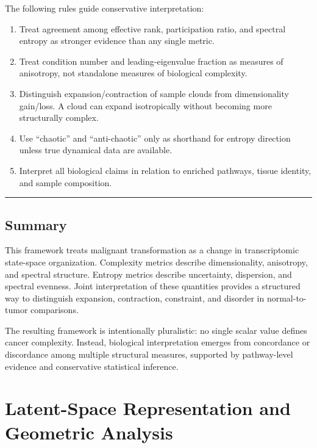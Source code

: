 \documentclass[
  letterpaper,
  DIV=11,
  numbers=noendperiod,
  openany,
  oneside]{scrreprt}
\providecommand{\tightlist}{%
  \setlength{\itemsep}{0pt}\setlength{\parskip}{0pt}}
\begin{document}
The following rules guide conservative interpretation:

\begin{enumerate}
\def\labelenumi{\arabic{enumi}.}
\tightlist
\item
  Treat agreement among effective rank, participation ratio, and
  spectral entropy as stronger evidence than any single metric.
\item
  Treat condition number and leading-eigenvalue fraction as measures of
  anisotropy, not standalone measures of biological complexity.
\item
  Distinguish expansion/contraction of sample clouds from dimensionality
  gain/loss. A cloud can expand isotropically without becoming more
  structurally complex.
\item
  Use ``chaotic'' and ``anti-chaotic'' only as shorthand for entropy
  direction unless true dynamical data are available.
\item
  Interpret all biological claims in relation to enriched pathways,
  tissue identity, and sample composition.
\end{enumerate}

\begin{center}\rule{0.5\linewidth}{0.5pt}\end{center}

\section{Summary}\label{summary}

This framework treats malignant transformation as a change in
transcriptomic state-space organization. Complexity metrics describe
dimensionality, anisotropy, and spectral structure. Entropy metrics
describe uncertainty, dispersion, and spectral evenness. Joint
interpretation of these quantities provides a structured way to
distinguish expansion, contraction, constraint, and disorder in
normal-to-tumor comparisons.

The resulting framework is intentionally pluralistic: no single scalar
value defines cancer complexity. Instead, biological interpretation
emerges from concordance or discordance among multiple structural
measures, supported by pathway-level evidence and conservative
statistical inference.

\chapter{Latent-Space Representation and Geometric
Analysis}\label{latent-space-representation-and-geometric-analysis}
\end{document}
